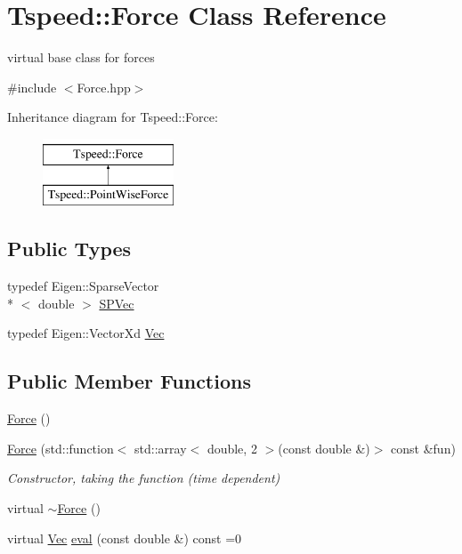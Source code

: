 \hypertarget{classTspeed_1_1Force}{\section{Tspeed\-:\-:Force Class Reference}
\label{classTspeed_1_1Force}
}


virtual base class for forces  




{\ttfamily \#include $<$Force.\-hpp$>$}

Inheritance diagram for Tspeed\-:\-:Force\-:\begin{figure}[H]
\begin{center}
\leavevmode
\includegraphics[height=2.000000cm]{classTspeed_1_1Force}
\end{center}
\end{figure}
\subsection*{Public Types}
\begin{DoxyCompactItemize}
\item 
typedef Eigen\-::\-Sparse\-Vector\\*
$<$ double $>$ \hyperlink{classTspeed_1_1Force_a5f4cd0ccfce951a7edded01c87ba6fb6}{S\-P\-Vec}
\item 
typedef Eigen\-::\-Vector\-Xd \hyperlink{classTspeed_1_1Force_ab33d4f6bed9bf9a136afd1ac5a918c93}{Vec}
\end{DoxyCompactItemize}
\subsection*{Public Member Functions}
\begin{DoxyCompactItemize}
\item 
\hyperlink{classTspeed_1_1Force_a1763e5fb61e4ef56be851800d854c96d}{Force} ()
\item 
\hyperlink{classTspeed_1_1Force_a2e90175e9cde9e42844ecad2e9123fbd}{Force} (std\-::function$<$ std\-::array$<$ double, 2 $>$(const double \&)$>$ const \&fun)
\begin{DoxyCompactList}\small\item\em Constructor, taking the function (time dependent) \end{DoxyCompactList}\item 
virtual \hyperlink{classTspeed_1_1Force_aa4789eaa544d8b37d25873a6c8aede55}{$\sim$\-Force} ()
\item 
virtual \hyperlink{classTspeed_1_1Force_ab33d4f6bed9bf9a136afd1ac5a918c93}{Vec} \hyperlink{classTspeed_1_1Force_ac174525b11c7c6a490411d00330a3564}{eval} (const double \&) const =0
\end{DoxyCompactItemize}
